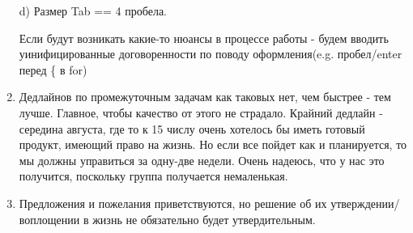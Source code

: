 \documentclass{article}
\begin{document}
\begin{enumerate}
    d) Размер Tab == 4 пробела.
    
    Если будут возникать какие-то нюансы в процессе работы - будем вводить уинифицированные договоренности по поводу оформления(e.g. пробел/enter перед \{ в for)
    
    \item Дедлайнов по промежуточным задачам как таковых нет, чем быстрее - тем лучше. Главное, чтобы качество от этого не страдало. Крайний дедлайн - середина августа, где то к 15 числу очень хотелось бы иметь готовый продукт, имеющий право на жизнь. Но если все пойдет как и планируется, то мы должны управиться за одну-две недели. Очень надеюсь, что у нас это получится, поскольку группа получается немаленькая.
    
    \item Предложения и пожелания приветствуются, но решение об их утверждении/воплощении в жизнь не обязательно будет утвердительным. 
\end{enumerate}
\end{document}
